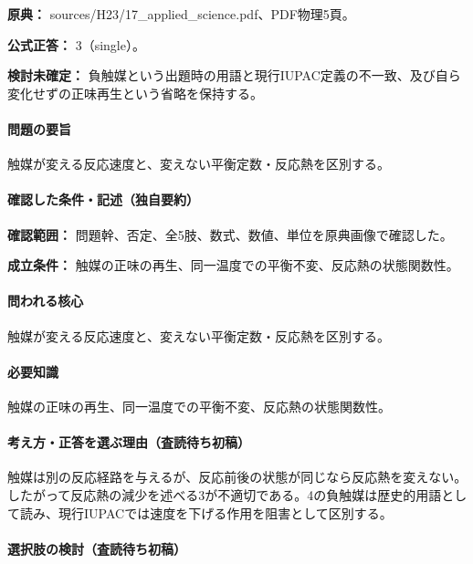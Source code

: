 \noindent\textbf{原典：} sources/H23/17\_applied\_science.pdf、PDF物理5頁。

\textbf{公式正答：} 3（single）。

\par\textbf{検討未確定：} 負触媒という出題時の用語と現行IUPAC定義の不一致、及び自ら変化せずの正味再生という省略を保持する。

\paragraph{問題の要旨} 触媒が変える反応速度と、変えない平衡定数・反応熱を区別する。

\paragraph{確認した条件・記述（独自要約）}\mbox{}\par

\noindent\textbf{確認範囲：} 問題幹、否定、全5肢、数式、数値、単位を原典画像で確認した。\par

\noindent\textbf{成立条件：} 触媒の正味の再生、同一温度での平衡不変、反応熱の状態関数性。\par

\paragraph{問われる核心} 触媒が変える反応速度と、変えない平衡定数・反応熱を区別する。

\paragraph{必要知識} 触媒の正味の再生、同一温度での平衡不変、反応熱の状態関数性。

\paragraph{考え方・正答を選ぶ理由（査読待ち初稿）} 触媒は別の反応経路を与えるが、反応前後の状態が同じなら反応熱を変えない。したがって反応熱の減少を述べる3が不適切である。4の負触媒は歴史的用語として読み、現行IUPACでは速度を下げる作用を阻害として区別する。

\paragraph{選択肢の検討（査読待ち初稿）}\mbox{}\par

